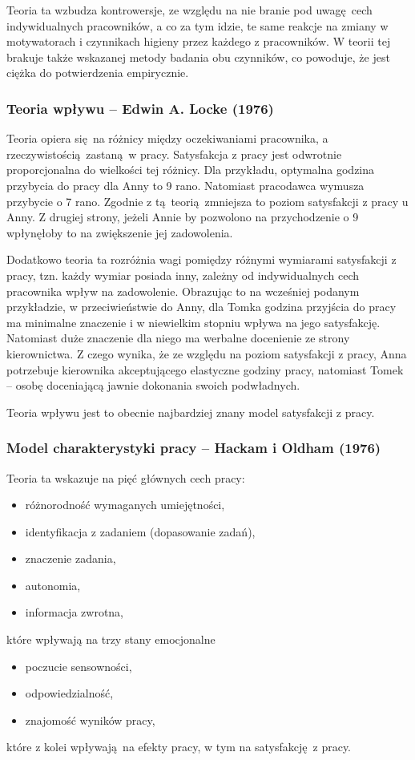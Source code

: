 Teoria ta wzbudza kontrowersje, ze względu na nie branie pod uwagę cech indywidualnych pracowników, a co za tym idzie, te same reakcje na zmiany w motywatorach i czynnikach higieny przez każdego z pracowników. W teorii tej brakuje także wskazanej metody badania obu czynników, co powoduje, że jest ciężka do potwierdzenia empirycznie.


\subsubsection{Teoria wpływu -- Edwin A. Locke (1976)}
\label{sec:theory-sat-locke}

Teoria \cite{locke1976nature} opiera się na różnicy między oczekiwaniami pracownika, a rzeczywistością zastaną w pracy. Satysfakcja z pracy jest odwrotnie proporcjonalna do wielkości tej różnicy. Dla przykładu, optymalna godzina przybycia do pracy dla Anny to 9 rano. Natomiast pracodawca wymusza przybycie o 7 rano. Zgodnie z tą teorią zmniejsza to poziom satysfakcji z pracy u Anny. Z drugiej strony, jeżeli Annie by pozwolono na przychodzenie o 9 wpłynęłoby to na zwiększenie jej zadowolenia.

Dodatkowo teoria ta rozróżnia wagi pomiędzy różnymi wymiarami satysfakcji z pracy, tzn. każdy wymiar posiada inny, zależny od indywidualnych cech pracownika wpływ na zadowolenie. Obrazując to na wcześniej podanym przykładzie, w przeciwieństwie do Anny, dla Tomka godzina przyjścia do pracy ma minimalne znaczenie i w niewielkim stopniu wpływa na jego satysfakcję. Natomiast duże znaczenie dla niego ma werbalne docenienie ze strony kierownictwa. Z czego
wynika, że ze względu na poziom satysfakcji z pracy, Anna potrzebuje kierownika akceptującego elastyczne godziny pracy, natomiast Tomek -- osobę doceniającą jawnie dokonania swoich podwładnych.

Teoria wpływu jest to obecnie najbardziej znany model satysfakcji z pracy.

\subsubsection{Model charakterystyki pracy -- Hackam i Oldham (1976)}
Teoria ta \cite{hackman1976motivation} wskazuje na pięć głównych cech pracy:
\begin{itemize}
\item różnorodność wymaganych umiejętności,
\item identyfikacja z zadaniem (dopasowanie zadań),
\item znaczenie zadania,
\item autonomia,
\item informacja zwrotna,
\end{itemize}
które wpływają na trzy stany emocjonalne
\begin{itemize}
\item poczucie sensowności,
\item odpowiedzialność,
\item znajomość wyników pracy,
\end{itemize}
które z kolei wpływają na efekty pracy, w tym na satysfakcję z pracy. 

